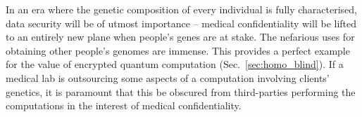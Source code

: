 In an era where the genetic composition of every individual is fully characterised, data security will be of utmost importance -- medical confidentiality will be lifted to an entirely new plane when people's genes are at stake. The nefarious uses for obtaining other people's genomes are immense. This provides a perfect example for the value of encrypted quantum computation (Sec.~\ref{sec:homo_blind}). If a medical lab is outsourcing some aspects of a computation involving clients' genetics, it is paramount that this be obscured from third-parties performing the computations in the interest of medical confidentiality. 